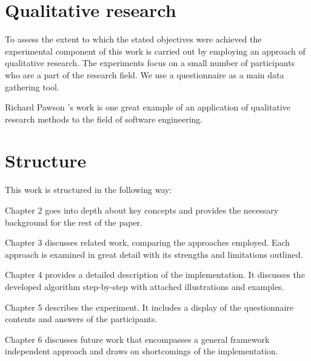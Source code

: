 \section {Qualitative research}
To assess the extent to which the stated objectives were achieved the experimental component of this work is carried out by employing an approach of qualitative research.
The experiments focus on a small number of participants who are a part of the research field.
We use a questionnaire as a main data gathering tool.
\n

Richard Pawson \cite{pawson}'s work is one great example of an application of qualitative research methods to the field of software engineering.

\section{Structure}

This work is structured in the following way: 

\n

\noindent Chapter 2 goes into depth about key concepts and provides the necessary background for the rest of the paper.

\n

\noindent Chapter 3 discusses related work, comparing the approaches employed. Each approach is examined in great detail with its strengths and limitations outlined.

\n

\noindent Chapter 4 provides a detailed description of the implementation. It discusses the developed algorithm step-by-step with attached illustrations and examples.

\n

\noindent Chapter 5 describes the experiment. It includes a display of the questionnaire contents and answers of the participants.

\n

\noindent Chapter 6 discusses future work that encompasses a general framework independent approach and draws on shortcomings of the implementation.
